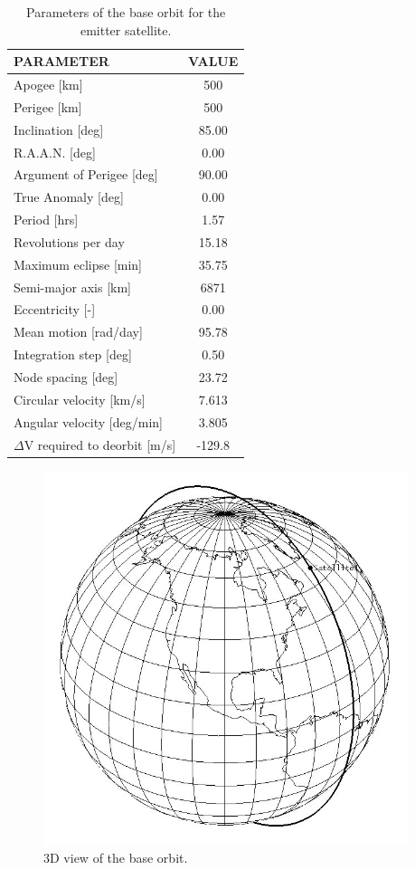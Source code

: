 \begin{table}
	\centering
		\begin{tabular}{p{5cm}|c}
		\textbf{PARAMETER} & \textbf{VALUE} \\ \hline \hline
		Apogee [km] & 500 \\
		Perigee [km] & 500 \\
		Inclination [deg] & 85.00 \\
		R.A.A.N. [deg] & 0.00 \\
		Argument of Perigee [deg] & 90.00 \\
		True Anomaly [deg] & 0.00 \\
		Period [hrs] & 1.57 \\
		Revolutions per day & 15.18 \\
		Maximum eclipse [min] & 35.75 \\
		Semi-major axis [km] & 6871 \\
		Eccentricity [-] & 0.00 \\
		Mean motion [rad/day] & 95.78 \\
		Integration step [deg] & 0.50 \\
		Node spacing [deg] & 23.72 \\
		Circular velocity [km/s] & 7.613 \\
		Angular velocity [deg/min] & 3.805 \\
		$\Delta$V required to deorbit [m/s] & -129.8 
		\end{tabular}
		\caption{Parameters of the base orbit for the emitter satellite.}
		\label{table:orbitParams}
\end{table}

\begin{figure}[h!]
\centering
\includegraphics[width=0.95\textwidth, angle=0]{chapters/img/finalOrbit.png}
\caption{3D view of the base orbit.}
\label{fig:finalOrbit}
\end{figure}  

